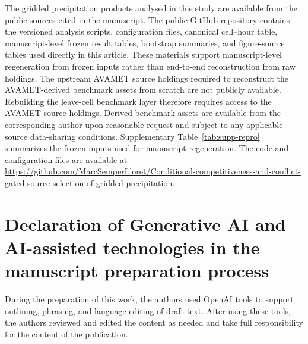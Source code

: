 \documentclass[preprint,12pt]{elsarticle}
\begin{document}
The gridded precipitation products analysed in this study are available from the public sources cited in the manuscript. The public GitHub repository contains the versioned analysis scripts, configuration files, canonical cell--hour table, manuscript-level frozen result tables, bootstrap summaries, and figure-source tables used directly in this article. These materials support manuscript-level regeneration from frozen inputs rather than end-to-end reconstruction from raw holdings. The upstream AVAMET source holdings required to reconstruct the AVAMET-derived benchmark assets from scratch are not publicly available. Rebuilding the leave-cell benchmark layer therefore requires access to the AVAMET source holdings. Derived benchmark assets are available from the corresponding author upon reasonable request and subject to any applicable source data-sharing conditions. Supplementary Table~\ref{tab:supp-repro} summarizes the frozen inputs used for manuscript regeneration. The code and configuration files are available at \url{https://github.com/MarcSemperLloret/Conditional-competitiveness-and-conflict-gated-source-selection-of-gridded-precipitation}.

\section*{Declaration of Generative AI and AI-assisted technologies in the manuscript preparation process}

During the preparation of this work, the authors used OpenAI tools to support outlining, phrasing, and language editing of draft text. After using these tools, the authors reviewed and edited the content as needed and take full responsibility for the content of the publication.





\def\includedsupplement{1}

\end{document}
